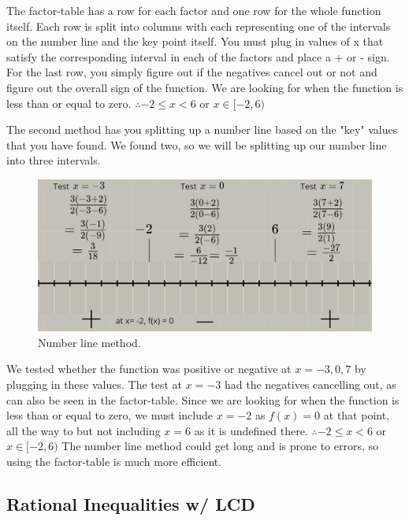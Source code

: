 \documentclass[12pt,fleqn]{book} %
\begin{document}
\vspace*{-4mm}

\noindent The factor-table has a row for each factor and one row for the whole function itself. Each row is split into columns with each representing one of the intervals on the number line and the key point itself. You must plug in values of x that satisfy the corresponding interval in each of the factors and place a + or - sign. For the last row, you simply figure out if the negatives cancel out or not and figure out the overall sign of the function. We are looking for when the function is less than or equal to zero. $\therefore -2\leq x<6$ or $x\in[-2,6)$

\pagebreak

\noindent The second method has you splitting up a number line based on the "key" values that you have found. We found two, so we will be splitting up our number line into three intervals.

\begin{figure}[h]
\centering\includegraphics[scale=0.4]{Pictures/NumberLine1.PNG}
\caption{Number line method.}
\end{figure}

\noindent We tested whether the function was positive or negative at $x=-3,0,7$ by plugging in these values. The test at $x=-3$ had the negatives cancelling out, as can also be seen in the factor-table. Since we are looking for when the function is less than or equal to zero, we must include $x=-2$ as $f(x) = 0$ at that point, all the way to but not including $x=6$ as it is undefined there. $\therefore -2\leq x<6$ or $x\in[-2,6)$ The number line method could get long and is prone to errors, so using the factor-table is much more efficient. 

\subsection{Rational Inequalities w/ LCD}
\end{document}
